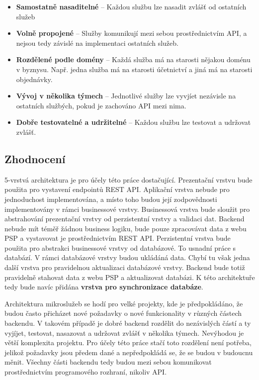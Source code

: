 \begin{itemize}
	\item \textbf{Samostatně nasaditelné} -- Každou službu lze nasadit zvlášť od ostatních služeb

	\item \textbf{Volně propojené} -- Služby komunikují mezi sebou prostřednictvím API, a nejsou tedy závislé na implementaci ostatních služeb.
	
	\item \textbf{Rozdělené podle domény} -- Každá služba má na starosti nějakou doménu v byznysu. \linebreak Např. jedna služba má na starosti účetnictví a jiná má na starosti objednávky.
	
	\item \textbf{Vývoj v několika týmech} -- Jednotlivé služby lze vyvjíet nezávisle na ostatních \linebreak službých, pokud je zachováno API mezi nima.
	
	\item \textbf{Dobře testovatelné a udržitelné} -- Každou službu lze testovat a udržovat zvlášť.
\end{itemize}

\subsection{Zhodnocení}
5-vrstvá architektura je pro účely této práce dostačující. Prezentační vrstvu bude použita pro vystavení endpointů REST API. Aplikační vrstva nebude pro jednoduchost \linebreak implementována, a místo toho budou její zodpovědnosti implementovány v rámci businessové vrstvy. Businessová vrstva bude sloužit pro abstrahování prezentační vrstvy od perzistentní vrstvy a validaci dat. Backend nebude mít téměř žádnou business logiku, bude pouze zpracovávat data z webu PSP a vystavovat je prostřednictvím REST API. Perzistentní vrstva bude použita pro abstrakci businessové vrstvy od databázové. To usnadní práce s databází. V rámci databázové vrstvy budou ukládáná data. Chybí tu však jedna další vrstva pro pravidelnou aktualizaci databázové vrstvy. Backend bude totiž pravidelně stahovat data z webu PSP a aktualizovat databázi. K této architektuře tedy bude navíc přidána \textbf{vrstva pro synchronizace databáze}.

Architektura mikroslužeb se hodí pro velké projekty, kde je předpokládáno, že budou často přicházet nové požadavky o nové funkcionality v různých částech backendu. V takovém případě je dobré backend rozdělit do nezávislých částí a ty vyjíjet, testovat, nasazovat a udržovat zvlášť v několika týmech. Nevýhodou je větší komplexita projektu. Pro účely této práce stačí toto rozdělení není potřeba, jelikož požadavky jsou předem dané a nepředpokládá se, že se budou \linebreak v budoucnu měnit. Všechny části backendu tedy budou mezi sebou komunikovat prostřednictvím programového rozhraní, nikoliv API.


